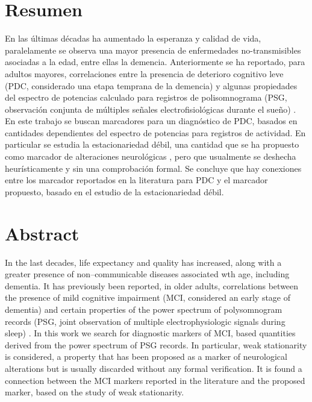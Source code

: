 \documentclass[12pt,letterpaper]{book}
\begin{document}
\setcounter{page}{1}

\chapter*{Resumen}

En las últimas décadas ha aumentado la esperanza y calidad de vida, paralelamente se observa una 
mayor presencia de enfermedades no-transmisibles asociadas a la edad, entre ellas la demencia.
%
Anteriormente se ha reportado, para adultos mayores, correlaciones entre la presencia de deterioro
cognitivo leve (PDC, considerado una etapa temprana de la demencia) y algunas propiedades del 
espectro  de potencias calculado para registros de polisomnograma (PSG, observación conjunta de 
múltiples señales electrofisiológicas durante el sueño) \cite{Brayet16}.
%
En este trabajo se buscan marcadores para un diagnóstico de PDC, basados en cantidades dependientes
del espectro de potencias para registros de actividad. En particular se estudia la estacionariedad 
débil, una cantidad que se ha propuesto como marcador de alteraciones neurológicas \cite{Cohen77}, 
pero que usualmente se deshecha heurísticamente y sin una comprobación formal.
%
Se concluye que hay conexiones entre los marcador reportados en la literatura para PDC y el 
marcador propuesto, basado en el estudio de la estacionariedad débil.

\newpage

\chapter*{Abstract}

In the last decades, life expectancy and quality has increased, along with a greater presence of
non--communicable diseases associated wth age, including dementia.
%
It has previously been reported, in older adults, correlations between the presence of mild 
cognitive impairment (MCI, considered an early stage of dementia) and certain properties of the power 
spectrum of polysomnogram records (PSG, joint observation of multiple electrophysiologic signals 
during sleep) \cite{Brayet16}. 
%
In this work we search for diagnostic markers of MCI, based quantities derived from the power 
spectrum of PSG records.
%
In particular, weak stationarity is considered, a property that has been proposed as a marker of 
neurological alterations \cite{Cohen77} but is usually discarded without any formal verification. 
%
It is found a connection between the MCI markers reported in the literature and the proposed 
marker, based on the study of weak stationarity.
\end{document}
